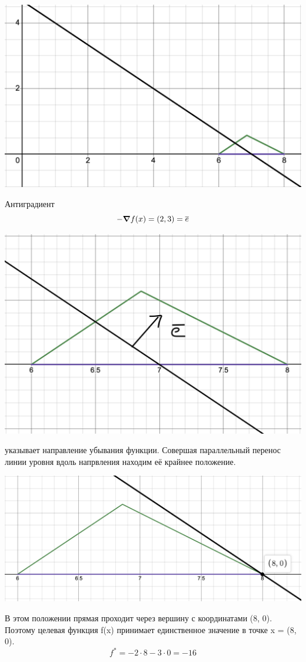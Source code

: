 \documentclass{article}
\begin{document}
\begin{center}
    \includegraphics[width=.7\textwidth]{func.png}
\end{center}
Антиградиент
\[-\grad f(x) = (2, 3) = \overline{e}\]
\begin{center}
    \includegraphics[width=.5\textwidth]{grad.png}
\end{center}
указывает направление убывания функции. 
Совершая параллельный перенос линии уровня вдоль напрвления находим её крайнее положение.
\begin{center}
    \includegraphics[width=.5\textwidth]{min.png}
\end{center}
В этом положении прямая проходит через вершину с координатами (8, 0).
Поэтому целевая функция f(x) принимает единственное значение в точке x = (8, 0).
\[f^* = -2\cdot 8 - 3\cdot 0 = -16\]
\end{document}

